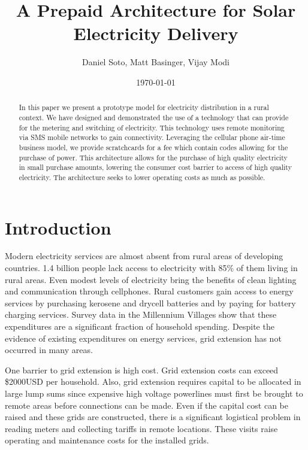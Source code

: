 \documentclass[conference]{IEEEtran}
\begin{document}
\title{A Prepaid Architecture for Solar Electricity Delivery}
\author{{Daniel Soto}, Matt Basinger, Vijay Modi}
\date{\today}
\maketitle

\begin{abstract}
In this paper we present a prototype model for electricity
distribution in a rural context.
We have designed and demonstrated the use of a technology that
can provide for the metering and switching of electricity.
This technology uses remote monitoring via SMS mobile networks
to gain connectivity.
Leveraging the cellular phone air-time business model, we provide
scratchcards for a fee which contain codes allowing for the purchase of
power.
This architecture allows for the purchase of high quality electricity in
small purchase amounts, lowering the consumer cost barrier to access of
high quality electricity.
The architecture seeks to lower operating costs as much as possible.
\end{abstract}

\section{Introduction}
Modern electricity services are almost absent from rural
areas of developing countries.
1.4 billion people lack access to electricity with 85\% of
them living in rural areas.\cite{WEO2010}
Even modest levels of electricity bring the benefits of clean lighting
and communication through cellphones.
Rural customers gain access to energy services by purchasing
kerosene and drycell batteries and by paying for battery charging
services.
Survey data in the Millennium Villages show that these expenditures
are a significant fraction of household spending.\cite{MVPEnergy}
Despite the evidence of existing
expenditures on energy services,
grid extension has not occurred in many areas.

One barrier to grid extension is high cost.
Grid extension costs can exceed \$2000USD per household.\cite{ModiPlanningKenya}
Also, grid extension requires capital to be allocated in large
lump sums since expensive high voltage powerlines must first be brought to remote areas
before connections can be made.
Even if the capital cost can be raised and these grids are
constructed, there is a significant
logistical problem in reading meters and collecting tariffs
in remote locations.
These visits raise operating and maintenance costs for the installed grids.
\end{document}
